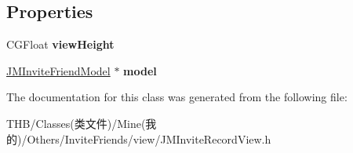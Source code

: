 \subsection*{Properties}
\begin{DoxyCompactItemize}
\item 
\mbox{\label{interface_j_m_invite_record_view_af1bd3f5cc2c2f11f26224c1f02e6d7a5}} 
C\+G\+Float {\bfseries view\+Height}
\item 
\mbox{\label{interface_j_m_invite_record_view_ace355a0146578ffcd2952ecf2b9e6589}} 
\mbox{\hyperlink{interface_j_m_invite_friend_model}{J\+M\+Invite\+Friend\+Model}} $\ast$ {\bfseries model}
\end{DoxyCompactItemize}


The documentation for this class was generated from the following file\+:\begin{DoxyCompactItemize}
\item 
T\+H\+B/\+Classes(类文件)/\+Mine(我的)/\+Others/\+Invite\+Friends/view/J\+M\+Invite\+Record\+View.\+h\end{DoxyCompactItemize}

